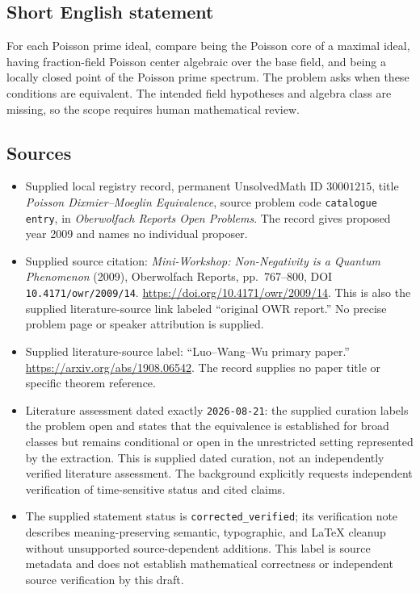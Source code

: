 \documentclass[11pt]{article}
\begin{document}
\subsection{Short English statement}
For each Poisson prime ideal, compare being the Poisson core of a maximal ideal, having fraction-field Poisson center algebraic over the base field, and being a locally closed point of the Poisson prime spectrum. The problem asks when these conditions are equivalent. The intended field hypotheses and algebra class are missing, so the scope requires human mathematical review.
\subsection{Sources}
\begin{itemize}
\item Supplied local registry record, permanent UnsolvedMath ID \(30001215\), title \emph{Poisson Dixmier--Moeglin Equivalence}, source problem code \texttt{catalogue entry}, in \emph{Oberwolfach Reports Open Problems}. The record gives proposed year 2009 and names no individual proposer.
\item Supplied source citation: \emph{Mini-Workshop: Non-Negativity is a Quantum Phenomenon} (2009), Oberwolfach Reports, pp.~767--800, DOI \texttt{10.4171/owr/2009/14}. \url{https://doi.org/10.4171/owr/2009/14}. This is also the supplied literature-source link labeled ``original OWR report.'' No precise problem page or speaker attribution is supplied.
\item Supplied literature-source label: ``Luo--Wang--Wu primary paper.'' \url{https://arxiv.org/abs/1908.06542}. The record supplies no paper title or specific theorem reference.
\item Literature assessment dated exactly \texttt{2026-08-21}: the supplied curation labels the problem open and states that the equivalence is established for broad classes but remains conditional or open in the unrestricted setting represented by the extraction. This is supplied dated curation, not an independently verified literature assessment. The background explicitly requests independent verification of time-sensitive status and cited claims.
\item The supplied statement status is \texttt{corrected\_verified}; its verification note describes meaning-preserving semantic, typographic, and LaTeX cleanup without unsupported source-dependent additions. This label is source metadata and does not establish mathematical correctness or independent source verification by this draft.
\end{itemize}
\end{document}
